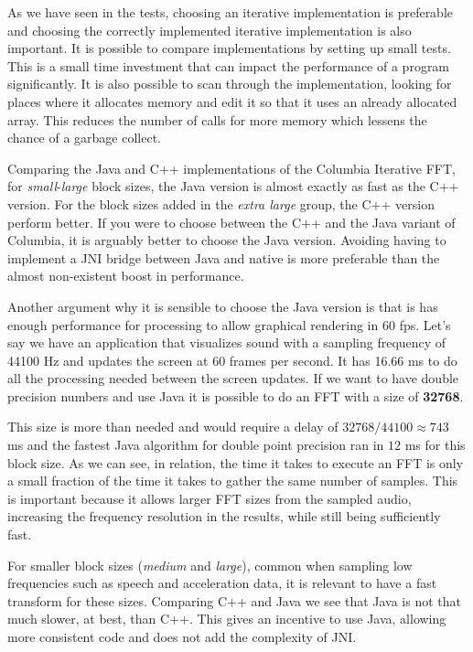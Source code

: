 As we have seen in the tests, choosing an iterative implementation is preferable and choosing the correctly implemented iterative implementation is also important. It is possible to compare implementations by setting up small tests. This is a small time investment that can impact the performance of a program significantly. It is also possible to scan through the implementation, looking for places where it allocates memory and edit it so that it uses an already allocated array. This reduces the number of calls for more memory which lessens the chance of a garbage collect.

Comparing the Java and C++ implementations of the Columbia Iterative FFT, for \emph{small}-\emph{large} block sizes, the Java version is almost exactly as fast as the C++ version. For the block sizes added in the \emph{extra large} group, the C++ version perform better. If you were to choose between the C++ and the Java variant of Columbia, it is arguably better to choose the Java version. Avoiding having to implement a JNI bridge between Java and native is more preferable than the almost non-existent boost in performance.

Another argument why it is sensible to choose the Java version is that is has enough performance for processing to allow graphical rendering in 60 \gls{fps}. Let's say we have an application that visualizes sound with a sampling frequency of 44100 Hz and updates the screen at 60 frames per second. It has 16.66 ms to do all the processing needed between the screen updates. If we want to have double precision numbers and use Java it is possible to do an FFT with a size of \textbf{32768}.


This size is more than needed and would require a delay of $32768/44100\approx 743 $ ms and the fastest Java algorithm for double point precision ran in $12$ ms for this block size. As we can see, in relation, the time it takes to execute an FFT is only a small fraction of the time it takes to gather the same number of samples. This is important because it allows larger FFT sizes from the sampled audio, increasing the frequency resolution in the results, while still being sufficiently fast.

For smaller block sizes (\emph{medium} and \emph{large}), common when sampling low frequencies such as speech and acceleration data, it is relevant to have a fast transform for these sizes. Comparing C++ and Java we see that Java is not that much slower, at best, than C++. This gives an incentive to use Java, allowing more consistent code and does not add the complexity of JNI.

